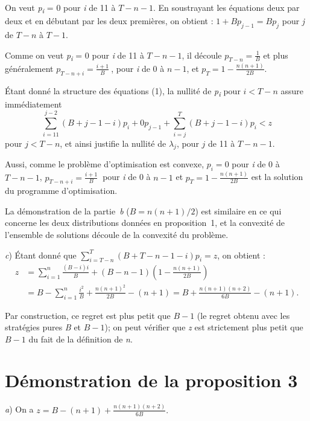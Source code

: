 \begin{Article}
\begin{refsection}[UmbhauerFR]
\begin{appendices}
On veut \emph{p\textsubscript{i}} = 0 pour \emph{i} de 11 à
\(T - n - 1\). En soustrayant les équations deux par deux et en débutant par
les deux premières, on obtient : \(1 + Bp_{j - 1} = Bp_{j}\) pour
\emph{j} de \(T - n\) à \(T - 1\).

Comme on veut \emph{p\textsubscript{i }}= 0 pour \emph{i} de 11 à
\(T - n - 1\), il découle \(p_{T - n} = \frac{1}{B}\) et plus
généralement \(p_{T - n + i} = \frac{i + 1}{B}\ \), pour \emph{i} de 0
à \(n - 1\), et \(p_{T} = 1 - \frac{n(n + 1)}{2B}\).

Étant donné la structure des équations (1), la nullité de
\emph{p\textsubscript{i}} pour \(i < T - n\) assure immédiatement
\[
\sum_{i = 11}^{j - 2}{(B + j - 1 - i)p_{i} + 0p_{j - 1} + \sum_{i = j}^{T}{(B + j - 1 - i)p_{i} < z}}
\]
pour \(j < T - n\), et ainsi justifie la nullité de $\lambda_{j}$, pour $j$ de 11 à \(T - n - 1\).

Aussi, comme le problème d'optimisation est convexe, \(p_{i} = 0\) pour
\emph{i} de 0 à \(T - n - 1\), \(p_{T - n + i} = \frac{i + 1}{B}\ \)
pour \emph{i} de 0 à \(n - 1\) et \(p_{T} = 1 - \frac{n(n + 1)}{2B}\)
est la solution du programme d'optimisation.

La démonstration de la partie~\emph{b} (\(B = n(n + 1)/2\)) est similaire en
ce qui concerne les deux distributions données en proposition~1, et la
convexité de l'ensemble de solutions découle de la convexité du
problème.

\emph{c}) Étant donné que \(\sum_{i = T - n}^{T}{(B + T - n - 1 - i)p_{i} = z}\), on obtient :
\begin{align*}
    z &= \sum_{i = 1}^{n}{\frac{(B - i)i}{B} + (B - n - 1)\left( 1 - \frac{n(n + 1)}{2B} \right)}\\
&= B - \sum_{i = 1}^{n}{\frac{i^{2}}{B} + \frac{n(n + 1)^{2}}{2B} - (n + 1) = B + \frac{n(n + 1)(n + 2)}{6B} - (n + 1)}.
\end{align*}

Par construction, ce regret est plus petit que \(B - 1\) (le regret
obtenu avec les stratégies pures \emph{B} et \(B - 1\)); on peut
vérifier que \emph{z} est strictement plus petit que \(B - 1\) du fait
de la définition de \emph{n}.

\section{Démonstration de la proposition 3}
\label{Annexe:Démonstration prop 3_Umbhauer}

\emph{a}) On a \(z = B - (n + 1) + \frac{n(n + 1)(n + 2)}{6B}.\)


\end{appendices}
\end{refsection}
\end{Article}
